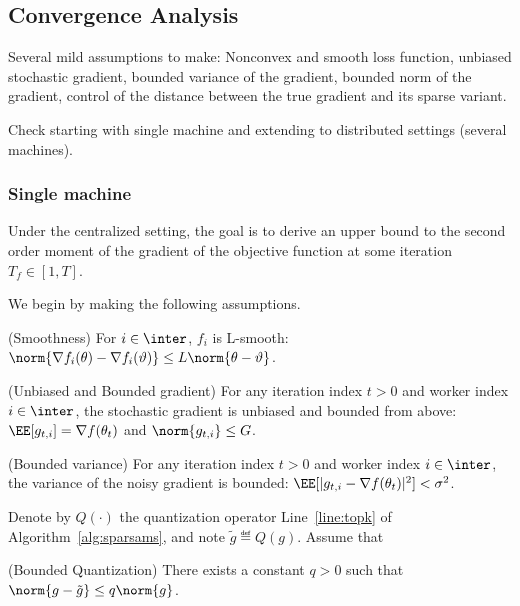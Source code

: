 \documentclass[11pt]{article}
\begin{document}
\subsection{Convergence Analysis}

Several mild assumptions to make: Nonconvex and smooth loss function, unbiased stochastic gradient, bounded variance of the gradient, bounded norm of the gradient, control of the distance between the true gradient and its sparse variant.

Check \citep{chen2020quantized} starting with single machine  and extending to distributed settings (several machines).

\subsubsection{Single machine}
Under the centralized setting, the goal is to derive an upper bound to the second order moment of the gradient of the objective function at some iteration $T_f \in [1, T]$.

We begin by making the following assumptions.

\begin{assumption}\label{ass:smooth}(Smoothness)
For $i \in \inter$, $f_i$ is  L-smooth: $\norm{\nabla f_i (\theta) - \nabla f_i (\vartheta)} \leq L \norm{\theta-\vartheta}$.
\end{assumption}

\begin{assumption}\label{ass:boundgrad}(Unbiased and Bounded gradient)
For any iteration index $t >0$ and worker index $i \in \inter$, the stochastic gradient is unbiased and bounded from above: $\EE[g_{t,i}] = \nabla f(\theta_t)$ and $\norm{g_{t,i}} \leq G$.
\end{assumption}

\begin{assumption}\label{ass:var}(Bounded variance)
For any iteration index $t >0$ and worker index $i \in \inter$, the variance of the noisy gradient is bounded: $\EE[|g_{t,i} - \nabla f(\theta_t)|^2] < \sigma^2$.
\end{assumption}

Denote by $Q(\cdot)$ the quantization operator Line~\ref{line:topk} of Algorithm~\ref{alg:sparsams}, and note $\tilde{g} \eqdef Q(g)$.
Assume that
\begin{assumption}\label{ass:var}(Bounded Quantization)
There exists a constant $q >0$ such that $\norm{g - \tilde{g}} \leq q \norm{g}$.
\end{assumption}
\end{document}
